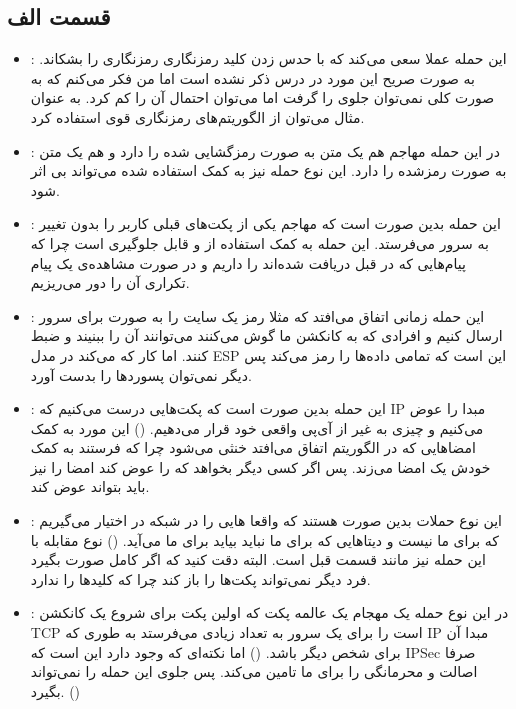 \documentclass[]{article}
\begin{document}
\subsection*{قسمت الف}
\begin{itemize}
    \item \textbf{}: این حمله عملا سعی می‌کند که با حدس زدن کلید رمزنگاری رمزنگاری را بشکاند. به صورت صریح این مورد در درس ذکر نشده است اما من فکر می‌کنم که به صورت کلی نمی‌توان جلوی  را گرفت اما می‌توان احتمال آن را کم کرد. به عنوان مثال می‌توان از الگوریتم‌های رمزنگاری قوی استفاده کرد.
    \item \textbf{}: در این حمله مهاجم هم یک متن به صورت رمزگشایی شده را دارد و هم یک متن به صورت رمزشده را دارد. این نوع حمله نیز به کمک  استفاده شده می‌تواند بی اثر شود.
    \item \textbf{}: این حمله بدین صورت است که مهاجم یکی از پکت‌های قبلی کاربر را بدون تغییر به سرور می‌فرستد. این حمله به کمک استفاده از  و  قابل جلوگیری است چرا که پیام‌هایی که در قبل دریافت شده‌اند را داریم و در صورت مشاهده‌ی یک پیام تکراری آن را دور می‌ریزیم.
    \item \textbf{}: این حمله زمانی اتفاق می‌افتد که مثلا رمز یک سایت را به صورت  برای سرور ارسال کنیم و افرادی که به کانکشن ما گوش می‌کنند می‌توانند آن را ببنیند و ضبط کنند. اما  کار که می‌کند در مدل ESP این است که تمامی داده‌ها را رمز می‌کند پس دیگر نمی‌توان پسورد‌ها را بدست آورد.
    \item \textbf{}: این حمله بدین صورت است که پکت‌هایی درست می‌کنیم که IP مبدا را عوض می‌کنیم و چیزی به غیر از آی‌پی واقعی خود قرار می‌دهیم. () این مورد به کمک امضا‌هایی که در الگوریتم اتفاق می‌افتد خنثی می‌شود چرا که فرستند به کمک  خودش یک امضا می‌زند. پس اگر کسی دیگر بخواهد که  را عوض کند امضا را نیز باید بتواند عوض کند.
    \item \textbf{}: این نوع حملات بدین صورت هستند که واقعا هایی را در شبکه در اختیار می‌گیریم که برای ما نیست و دیتا‌هایی که برای ما نباید بیاید برای ما می‌آید.  () نوع مقابله با این حمله نیز مانند قسمت قبل است. البته دقت کنید که اگر کامل  صورت بگیرد فرد دیگر نمی‌تواند پکت‌ها را باز کند چرا که کلید‌ها را ندارد.
    \item \textbf{}: در این نوع حمله یک مهجام یک عالمه پکت  که اولین پکت برای شروع یک کانکشن TCP است را برای یک سرور به تعداد زیادی می‌فرستد به طوری که IP مبدا آن برای شخص دیگر باشد. () اما نکته‌ای که وجود دارد این است که IPSec صرفا اصالت و محرمانگی را برای ما تامین می‌کند. پس جلوی این حمله را نمی‌تواند بگیرد. ()
\end{itemize}
\end{document}
